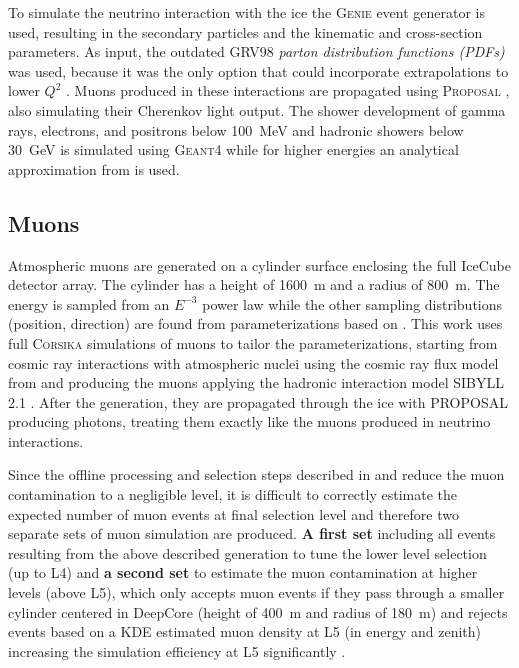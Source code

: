 To simulate the neutrino interaction with the ice the \textsc{Genie} event generator  is used, resulting in the secondary particles and the kinematic and cross-section parameters. As input, the outdated GRV98  \textit{parton distribution functions (PDFs)} was used, because it was the only option that could incorporate extrapolations to lower $Q^2$ . Muons produced in these interactions are propagated using \textsc{Proposal} , also simulating their Cherenkov light output. The shower development of gamma rays, electrons, and positrons below \SI{100}{\mega\electronvolt} and hadronic showers below \SI{30}{\giga\electronvolt} is simulated using \textsc{Geant4}  while for higher energies an analytical approximation from  is used.


\subsection{Muons}

Atmospheric muons are generated on a cylinder surface enclosing the full IceCube detector array. The cylinder has a height of \SI{1600}{\meter} and a radius of \SI{800}{\meter}. The energy is sampled from an $E^{-3}$ power law while the other sampling distributions (position, direction) are found from parameterizations based on . This work uses full \textsc{Corsika}  simulations of muons to tailor the parameterizations, starting from cosmic ray interactions with atmospheric nuclei using the cosmic ray flux model from  and producing the muons applying the hadronic interaction model SIBYLL 2.1 . After the generation, they are propagated through the ice with PROPOSAL producing photons, treating them exactly like the muons produced in neutrino interactions.

Since the offline processing and selection steps described in  and  reduce the muon contamination to a negligible level, it is difficult to correctly estimate the expected number of muon events at final selection level and therefore two separate sets of muon simulation are produced. \textbf{A first set} including all events resulting from the above described generation to tune the lower level selection (up to L4) and \textbf{a second set} to estimate the muon contamination at higher levels (above L5), which only accepts muon events if they pass through a smaller cylinder centered in DeepCore (height of \SI{400}{\meter} and radius of \SI{180}{\meter}) and rejects events based on a KDE estimated muon density at L5 (in energy and zenith) increasing the simulation efficiency at L5 significantly .


